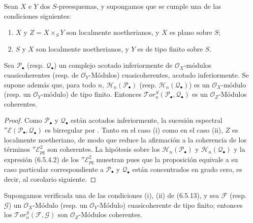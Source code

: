 \begin{proposition}[6.5.13]
\label{III.6.5.13}
Sean $X$ e $Y$ dos $S$-preesquemas, y supongamos que se cumple
una de las condiciones siguientes:
\begin{enumerate}
  \item[\textup{(i)}] $X$ y $Z=X\times_S Y$ son localmente noetherianos, y
    $X$ es plano sobre $S$;
  \item[\textup{(ii)}] $S$ y $X$ son localmente noetherianos, y $Y$ es de
    tipo finito sobre $S$.
\end{enumerate}
Sea $\mathscr P_\bullet$ \textup{(resp.} $\mathscr Q_\bullet$) un complejo
acotado inferiormente de $\mathscr O_X$-módulos cuasicoherentes
\textup{(resp.} de $\mathscr O_Y$-Módulos) cuasicoherentes, acotado inferiormente. Se supone además que, para todo $n$,
$\mathscr H_n(\mathscr P_\bullet)$ \textup{(resp.}
$\mathscr H_n(\mathscr Q_\bullet)$) es un $\mathscr O_X$-módulo
\textup{(resp.} un $\mathscr O_Y$-módulo) de tipo finito. Entonces
$\mathscr{T}\!or_n^S(\mathscr P_\bullet,\mathscr Q_\bullet)$
es un $\mathscr O_Z$-Módulos coherentes.
\end{proposition}

\begin{proof}
Como $\mathscr P_\bullet$ y $\mathscr Q_\bullet$ están acotados
inferiormente, la sucesión espectral
$''\mathscr E(\mathscr P_\bullet,\mathscr Q_\bullet)$ es birregular por
. Tanto en el caso (i) como en el caso (ii), $Z$
es localmente noetheriano, de modo que  reduce
la afirmación a la coherencia de los términos
$''\mathscr E_{pq}^2$ son coherentes. La hipótesis sobre los
$\mathscr H_n(\mathscr P_\bullet)$ y
$\mathscr H_n(\mathscr Q_\bullet)$ y la expresión (6.5.4.2) de los
$''\mathscr E_{pq}^2$ muestran pues que la proposición equivale a su
caso particular correspondiente a $\mathscr P_\bullet$ y $\mathscr Q_\bullet$ están
concentrados en grado cero, es decir, al corolario siguiente.
\end{proof}

\begin{corollary}[6.5.14]
Supongamos verificada una de las condiciones \textup{(i), (ii)} de \textup{(6.5.13)}, y sea
$\mathscr F$ \textup{(resp.} $\mathscr G$) un $\mathscr O_X$-Módulo \textup{(resp.} un
$\mathscr O_Y$-Módulo) cuasicoherente de tipo finito; entonces los
$\mathscr{T}\!or_n^S(\mathscr F,\mathscr G)$ son $\mathscr O_Z$-Módulos
coherentes.
\end{corollary}

